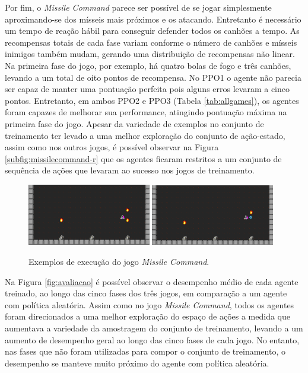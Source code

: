 Por fim, o \textit{Missile Command} parece ser possível de se jogar simplesmente aproximando-se dos mísseis mais próximos e os atacando. Entretanto é necessário um tempo de reação hábil para conseguir defender todos os canhões a tempo. As recompensas totais de cada fase variam conforme o número de canhões e mísseis inimigos também mudam, gerando uma distribuição de recompensas não linear. Na primeira fase do jogo, por exemplo, há quatro bolas de fogo e três canhões, levando a um total de oito pontos de recompensa. No PPO1 o agente não parecia ser capaz de manter uma pontuação perfeita pois alguns erros levaram a cinco pontos. Entretanto, em ambos PPO2 e PPO3 (Tabela \ref{tab:allgames}), os agentes foram capazes de melhorar sua performance, atingindo pontuação máxima na primeira fase do jogo. Apesar da variedade de exemplos no conjunto de treinamento ter levado a uma melhor exploração do conjunto de ação-estado, assim como nos outros jogos, é possível observar na Figura \ref{subfig:missilecommand-r} que os agentes ficaram restritos a um conjunto de sequência de ações que levaram ao sucesso nos jogos de treinamento.

\begin{figure}[ht]
 \begin{center}
  \subfigure
  {
    \includegraphics[width=0.48\textwidth]{./fig/gvgai-missilecommand-lvl0-v0-frame12}
    \label{subfig:m-frame1}
  } 
  \subfigure
  {
    \includegraphics[width=0.48\textwidth]{./fig/gvgai-missilecommand-lvl0-v0-frame13}
    \label{subfig:m-frame2}
  }
  \caption{Exemplos de execução do jogo \textit{Missile Command}.}
  \label{fig:missilecommandframe}
\end{center}
\end{figure}

Na Figura \ref{fig:avaliacao} é possível observar o desempenho médio de cada agente treinado, ao longo das cinco fases dos três jogos, em comparação a um agente com política aleatória. Assim como no jogo \textit{Missile Command}, todos os agentes foram direcionados a uma melhor exploração do espaço de ações a medida que aumentava a variedade da amostragem do conjunto de treinamento, levando a um aumento de desempenho geral ao longo das cinco fases de cada jogo. No entanto, nas fases que não foram utilizadas para compor o conjunto de treinamento, o desempenho se manteve muito próximo do agente com política aleatória.

